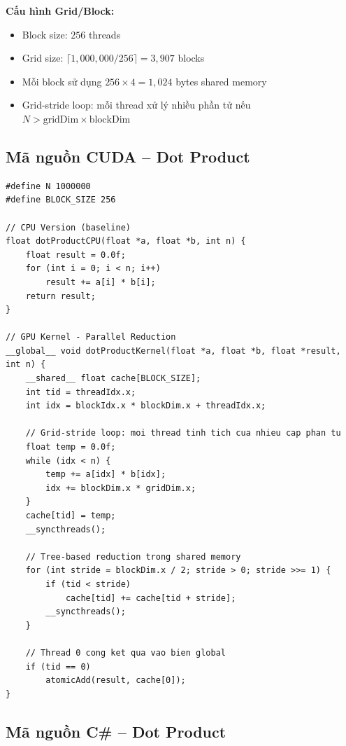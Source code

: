\documentclass[12pt,a4paper]{article}
\begin{document}
\textbf{Cấu hình Grid/Block:}
\begin{itemize}[nosep]
    \item Block size: $256$ threads
    \item Grid size: $\lceil 1{,}000{,}000 / 256 \rceil = 3{,}907$ blocks
    \item Mỗi block sử dụng $256 \times 4 = 1{,}024$ bytes shared memory
    \item Grid-stride loop: mỗi thread xử lý nhiều phần tử nếu $N > \text{gridDim} \times \text{blockDim}$
\end{itemize}

\subsection{Mã nguồn CUDA -- Dot Product}

\begin{lstlisting}[style=cudastyle, caption={CUDA Kernel -- Dot Product với Parallel Reduction}, label={lst:dot_cuda}]
#define N 1000000
#define BLOCK_SIZE 256

// CPU Version (baseline)
float dotProductCPU(float *a, float *b, int n) {
    float result = 0.0f;
    for (int i = 0; i < n; i++)
        result += a[i] * b[i];
    return result;
}

// GPU Kernel - Parallel Reduction
__global__ void dotProductKernel(float *a, float *b, float *result, int n) {
    __shared__ float cache[BLOCK_SIZE];
    int tid = threadIdx.x;
    int idx = blockIdx.x * blockDim.x + threadIdx.x;

    // Grid-stride loop: moi thread tinh tich cua nhieu cap phan tu
    float temp = 0.0f;
    while (idx < n) {
        temp += a[idx] * b[idx];
        idx += blockDim.x * gridDim.x;
    }
    cache[tid] = temp;
    __syncthreads();

    // Tree-based reduction trong shared memory
    for (int stride = blockDim.x / 2; stride > 0; stride >>= 1) {
        if (tid < stride)
            cache[tid] += cache[tid + stride];
        __syncthreads();
    }

    // Thread 0 cong ket qua vao bien global
    if (tid == 0)
        atomicAdd(result, cache[0]);
}
\end{lstlisting}

\subsection{Mã nguồn C\# -- Dot Product}
\end{document}

